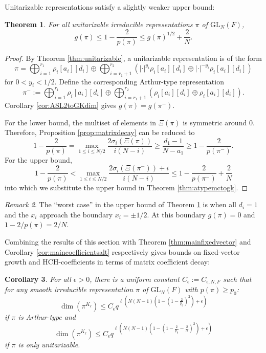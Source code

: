\documentclass{amsart}
\newcommand{\lf}{\left}
\newcommand{\ri}{\right}
\newcommand{\f}{\frac}
\newcommand{\GL}{\mathrm{GL}}
\newcommand{\eps}{\epsilon}
\newcommand{\1}{\m 1}
\newtheorem{thm}{Theorem}[subsection]
\newtheorem{cor}[thm]{Corollary}
\theoremstyle{remark}
\newtheorem{rmk}[thm]{Remark}
\theoremstyle{definition}
\numberwithin{equation}{subsection}
\newcommand{\red}[1]{\textcolor{red}{#1}}
\begin{document}
Unitarizable representations satisfy a slightly weaker upper bound:

\begin{thm}\label{thm:unitarymctogk}
For all unitarizable irreducible representations $\pi$ of $\GL_N(F)$,
\[
g(\pi) \leq 1 - \f2{p(\pi)} \leq g(\pi)^{1/2} + \f2N. 
\]
\end{thm}


\begin{proof}
By Theorem \ref{thm:unitarizable}, a unitarizable representation is of the form
\[
\pi  = \bigoplus_{i=1}^{r_1}\rho_i[a_i][d_i] \oplus \bigoplus_{i=r_1+1}^{r_2} ( |\cdot|^{y_i} \rho_i[a_i][d_i] \oplus |\cdot|^{-y_i} \rho_i[a_i][d_i])
\]
for $0 < y_i < 1/2$. Define the corresponding Arthur-type representation
\[
\pi^- := \bigoplus_{i=1}^{r_1}\rho_i[a_i][d_i] \oplus \bigoplus_{i=r_1 + 1}^{r_2} (\rho_i[a_i][d_i] \oplus \rho_i[a_i][d_i]).
\]
Corollary \ref{cor:ASL2toGKdim} gives $g(\pi) = g(\pi^-)$. 

For the lower bound, the multiset of elements in $\Xi(\pi)$ is symmetric around $0$. Therefore, Proposition \ref{prop:matrixdecay} can be reduced to 
\[
1 - \f2{p(\pi)} = \max_{1 \leq i \leq N/2} \f{2 \sigma_i(\Xi(\pi))}{i(N-i)}  \geq \f{d_1 - 1}{N - a_1} \geq 1- \f2{p(\pi^-)}. 
\]
For the upper bound,
\[
1 - \f2{p(\pi)} < \max_{1 \leq i \leq N/2} \f{2 \sigma_i(\Xi(\pi^-)) + i}{i(N-i)} \leq 1 - \f2{p(\pi^-)} + \f2N
\]
into which we substitute the upper bound in Theorem \ref{thm:atypemctogk}. 
\end{proof}

\begin{rmk}
The ``worst case'' in the upper bound of Theorem \ref{thm:unitarymctogk} is when all $d_i = 1$ and the $x_i$ approach the boundary $x_i = \pm 1/2$. At this boundary $g(\pi) = 0$ and $1 - 2/p(\pi) = 2/N$.
\end{rmk} 

Combining the results of this section with Theorem \ref{thm:mainfixedvector} and Corollary \ref{cor:maincoefficientsalt} respectively gives bounds on fixed-vector growth and HCH-coefficients in terms of matrix coefficient decay:

\begin{cor}
For all $\eps > 0$, there is a uniform constant $C_\eps := C_{\eps, N, F}$ such that for any smooth irreducible representation $\pi$ of $\GL_N(F)$ with $p(\pi) \geq p_0$:
\[
\dim(\pi^{K_\ell}) \leq C_\eps q^{\ell \left(N(N-1) \lf(1 -  \lf( 1 - \f 2{p_0}\ri)^2 \ri)+\eps \right)}
\]
if $\pi$ is Arthur-type and
\[
\dim(\pi^{K_\ell}) \leq C_\eps q^{\ell \left( N(N-1) \lf(1 -  \lf( 1 - \f 2{p_0} - \f2N\ri)^2 \ri)+\eps\right) }
\]
if $\pi$ is only unitarizable. 
\end{cor}
\end{document}
